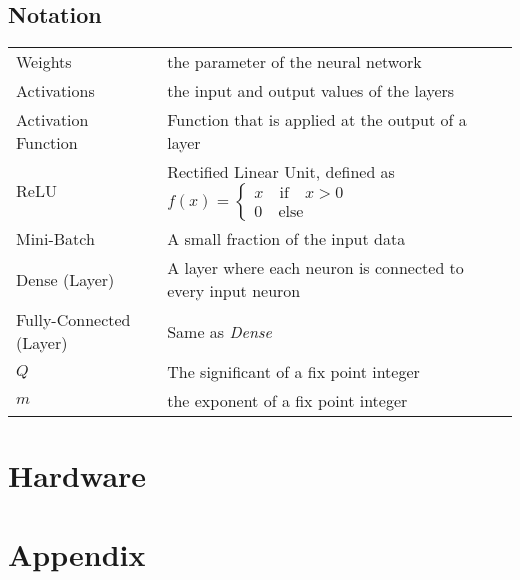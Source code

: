\documentclass[a4paper]{article}
\begin{document}
\subsection*{Notation}
\begin{center}
\begin{tabular}{lp{3.5in}}
	Weights 	& the parameter of the neural network		\\
	Activations	& the input and output values of the layers	\\
	Activation Function & Function that is applied at the output of a layer \\
	ReLU		& Rectified Linear Unit, defined as  $f(x) = \begin{cases}
		x \quad \text{if} \quad x > 0 \\
		0 \quad \text{else}
	\end{cases}$						\\
	Mini-Batch	& A small fraction of the input data \\
	Dense (Layer) & A layer where each neuron is connected to every input neuron \\
	Fully-Connected (Layer) & Same as \emph{Dense} 		\\
	$Q$			& The significant of a fix point integer 	\\
	$m$			& the exponent of a fix point integer		
\end{tabular}
\end{center}









\section{Hardware}







%

\section{Appendix}






\listoffigures
\listoftables


\end{document}
